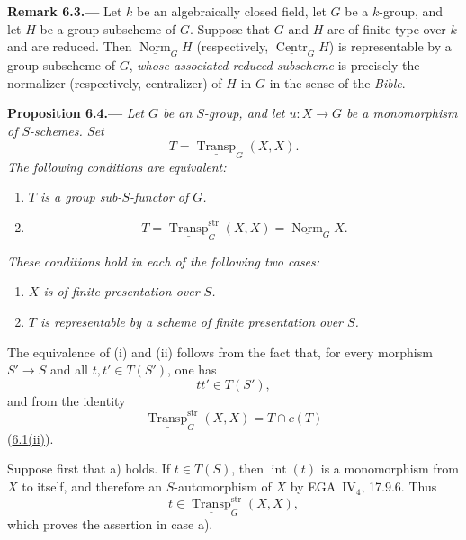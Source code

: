 
\medskip
{}\label{rem:sga3-VIB-6.3}%
\noindent\textbf{Remark 6.3.---}
Let \(k\) be an algebraically closed field, let \(G\) be a
\(k\)-group, and let \(H\) be a group subscheme of \(G\). Suppose
that \(G\) and \(H\) are of finite type over \(k\) and are
reduced. Then
\(\underline{\operatorname{Norm}}_G H\) (respectively,
\(\underline{\operatorname{Centr}}_G H\)) is representable by a
group subscheme of \(G\), \emph{whose associated reduced subscheme} is
precisely the normalizer (respectively, centralizer) of \(H\) in
\(G\) in the sense of the \emph{Bible}.

\medskip
{}\label{prop:sga3-VIB-6.4}%
\noindent\textbf{Proposition 6.4.---}
\emph{Let \(G\) be an \(S\)-group, and let \(u:X\to G\) be a
monomorphism of \(S\)-schemes. Set}
\[
  T=\underline{\operatorname{Transp}}_G(X,X).
\]
\emph{The following conditions are equivalent:}
\begin{enumerate}
\item[\textup{(i)}]\label{cond:sga3-VIB-6.4-i}
  \emph{\(T\) is a group sub-\(S\)-functor of \(G\).}
\item[\textup{(ii)}]\label{cond:sga3-VIB-6.4-ii}
  \emph{\[
    T=\underline{\operatorname{Transp}}^{\mathrm{str}}_G(X,X)
     =\underline{\operatorname{Norm}}_G X.
  \]}
\end{enumerate}
\emph{These conditions hold in each of the following two cases:}
\begin{enumerate}
\item[\textup{a)}]\label{case:sga3-VIB-6.4-a}
  \emph{\(X\) is of finite presentation over \(S\).}
\item[\textup{b)}]\label{case:sga3-VIB-6.4-b}
  \emph{\(T\) is representable by a scheme of finite
  presentation over \(S\).}
\end{enumerate}

The equivalence of \textup{(i)} and \textup{(ii)} follows from
the fact that, for every morphism \(S'\to S\) and all
\(t,t'\in T(S')\), one has
\[
  tt'\in T(S'),
\]
and from the identity
\[
  \underline{\operatorname{Transp}}^{\mathrm{str}}_G(X,X)
  =T\cap c(T)
\]
(\hyperref[def:sga3-VIB-6.1]{6.1\textup{(ii)}}).

Suppose first that \textup{a)} holds. If \(t\in T(S)\), then
\(\operatorname{int}(t)\) is a monomorphism from \(X\) to itself,
and therefore an \(S\)-automorphism of \(X\) by EGA~IV\(_4\),
17.9.6. Thus
\[
  t\in\underline{\operatorname{Transp}}^{\mathrm{str}}_G(X,X),
\]
which proves the assertion in case \textup{a)}.


